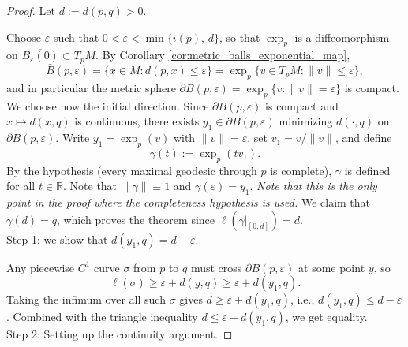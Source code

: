 \begin{proof}
Let $d := d(p,q) > 0$.
 
Choose $\varepsilon$ such that $0 < \varepsilon < \min\{i(p),\, d\}$, so that $\exp_p$ is a diffeomorphism on $\overline{B_\varepsilon(0)} \subset T_pM$. By Corollary \ref{cor:metric_balls_exponential_map},
\[
\bar{B}(p,\varepsilon) = \{x \in M : d(p,x) \leqslant \varepsilon\} = \exp_p\{v \in T_pM : \|v\| \leqslant \varepsilon\},
\]
and in particular the metric sphere $\partial B(p,\varepsilon) = \exp_p\{v : \|v\| = \varepsilon\}$ is compact.\\

We choose now the initial direction. Since $\partial B(p,\varepsilon)$ is compact and $x \mapsto d(x,q)$ is continuous, there exists $y_1 \in \partial B(p,\varepsilon)$ minimizing $d(\cdot, q)$ on $\partial B(p,\varepsilon)$. Write $y_1 = \exp_p(v)$ with $\|v\| = \varepsilon$, set $v_1 = v/\|v\|$, and define
\[
\gamma(t) := \exp_p(t v_1).
\]
By the hypothesis (every maximal geodesic through $p$ is complete), $\gamma$ is defined for all $t \in \mathbb{R}$. Note that $\|\dot{\gamma}\| \equiv 1$ and $\gamma(\varepsilon) = y_1$. \emph{Note that this is the only point in the proof where the completeness hypothesis is used.} We claim that $\gamma(d) = q$, which proves the theorem since $\ell(\gamma|_{[0,d]}) = d$.\\
 
Step 1: we show that $d(y_1, q) = d - \varepsilon$.

Any piecewise $C^1$ curve $\sigma$ from $p$ to $q$ must cross $\partial B(p,\varepsilon)$ at some point $y$, so
\[
\ell(\sigma) \geqslant \varepsilon + d(y, q) \geqslant \varepsilon + d(y_1, q).
\]
Taking the infimum over all such $\sigma$ gives $d \geqslant \varepsilon + d(y_1, q)$, i.e., $d(y_1, q) \leqslant d - \varepsilon$. Combined with the triangle inequality $d \leqslant \varepsilon + d(y_1,q)$, we get equality.\\
 
Step 2: Setting up the continuity argument.


\end{proof}
